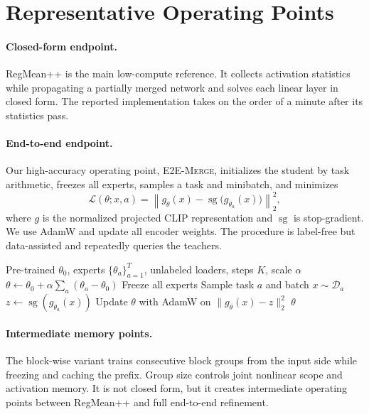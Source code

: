 \documentclass[letterpaper]{article} %
\newcommand{\method}{\textup{\textsc{E2E-Merge}}\xspace}
\theoremstyle{plain}
\theoremstyle{definition}
\begin{document}
\section{Representative Operating Points}
\label{sec:method}

\paragraph{Closed-form endpoint.}
RegMean++ is the main low-compute reference.
It collects activation statistics while propagating a partially merged network and solves each linear layer in closed form.
The reported implementation takes on the order of a minute after its statistics pass.

\paragraph{End-to-end endpoint.}
Our high-accuracy operating point, \method, initializes the student by task arithmetic, freezes all experts, samples a task and minibatch, and minimizes
\begin{equation}
\mathcal L(\theta;x,a)=
\left\|g_\theta(x)-\operatorname{sg}\!\bigl(g_{\theta_a}(x)\bigr)\right\|_2^2,
\label{eq:method-loss}
\end{equation}
where $g$ is the normalized projected CLIP representation and $\operatorname{sg}$ is stop-gradient.
We use AdamW and update all encoder weights.
The procedure is label-free but data-assisted and repeatedly queries the teachers.

\begin{algorithm}[tb]
\caption{End-to-end representation distillation (\method)}
\label{alg:e2e}
\begin{algorithmic}[1]
\REQUIRE Pre-trained $\theta_0$, experts $\{\theta_a\}_{a=1}^T$, unlabeled loaders,
steps $K$, scale $\alpha$
\STATE $\theta\leftarrow\theta_0+\alpha\sum_a(\theta_a-\theta_0)$
\STATE Freeze all experts
    \STATE Sample task $a$ and batch $x\sim\mathcal D_a$
    \STATE $z\leftarrow\operatorname{sg}(g_{\theta_a}(x))$
    \STATE Update $\theta$ with AdamW on $\|g_\theta(x)-z\|_2^2$
\ENDFOR
\RETURN $\theta$
\end{algorithmic}
\end{algorithm}

\paragraph{Intermediate memory points.}
The block-wise variant trains consecutive block groups from the input side while freezing and caching the prefix.
Group size controls joint nonlinear scope and activation memory.
It is not closed form, but it creates intermediate operating points between RegMean++ and full end-to-end refinement.
\end{document}
